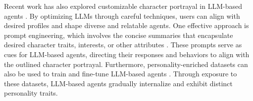 Recent work has also explored customizable character portrayal in LLM-based agents \cite{DBLP:journals/corr/abs-2307-00184}. 
By optimizing LLMs through careful techniques, users can align with desired profiles and shape diverse and relatable agents.
One effective approach is prompt engineering, which involves the concise summaries that encapsulate desired character traits, interests, or other attributes \cite{DBLP:journals/corr/abs-2304-03442, DBLP:conf/uist/ParkPCMLB22}. 
These prompts serve as cues for LLM-based agents, directing their responses and behaviors to align with the outlined character portrayal. 
Furthermore, personality-enriched datasets can also be used to train and fine-tune LLM-based agents \cite{DBLP:conf/acl/KielaWZDUS18, DBLP:conf/acl/KwonLKLKD23}. Through exposure to these datasets, LLM-based agents gradually internalize and exhibit distinct personality traits.



